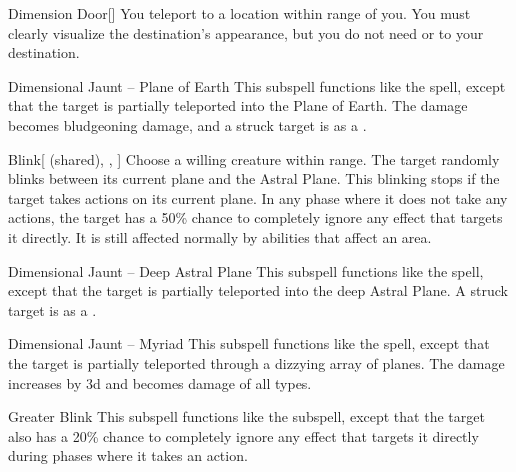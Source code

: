 \begin{ability}[\nth{4}]{Dimension Door}[]
You teleport to a location within \rngext range of you.
You must clearly visualize the destination's appearance, but you do not need  or  to your destination.
\end{ability}
\vspace{0.25em}


\begin{ability}[\nth{4}]{Dimensional Jaunt -- Plane of Earth}
This subspell functions like the  spell, except that the target is partially teleported into the Plane of Earth.
The damage becomes bludgeoning damage, and a struck target is  as a .
\end{ability}
\vspace{0.25em}


\begin{ability}[\nth{5}]{Blink}[ (shared), , ]
Choose a willing creature within \rngclose range.
The target randomly blinks between its current plane and the Astral Plane.
This blinking stops if the target takes actions on its current plane.
In any phase where it does not take any actions, the target has a 50\% chance to completely ignore any effect that targets it directly.
It is still affected normally by abilities that affect an area.
\end{ability}
\vspace{0.25em}


\begin{ability}[\nth{6}]{Dimensional Jaunt -- Deep Astral Plane}
This subspell functions like the  spell, except that the target is partially teleported into the deep Astral Plane.
A struck target is  as a .
\end{ability}
\vspace{0.25em}


\begin{ability}[\nth{9}]{Dimensional Jaunt -- Myriad}
This subspell functions like the  spell, except that the target is partially teleported through a dizzying array of planes.
The damage increases by \plus3d and becomes damage of all types.
\end{ability}
\vspace{0.25em}


\begin{ability}[\nth{9}]{Greater Blink}
This subspell functions like the  subspell, except that the target also has a 20\% chance to completely ignore any effect that targets it directly during phases where it takes an action.
\end{ability}
\vspace{0.25em}

